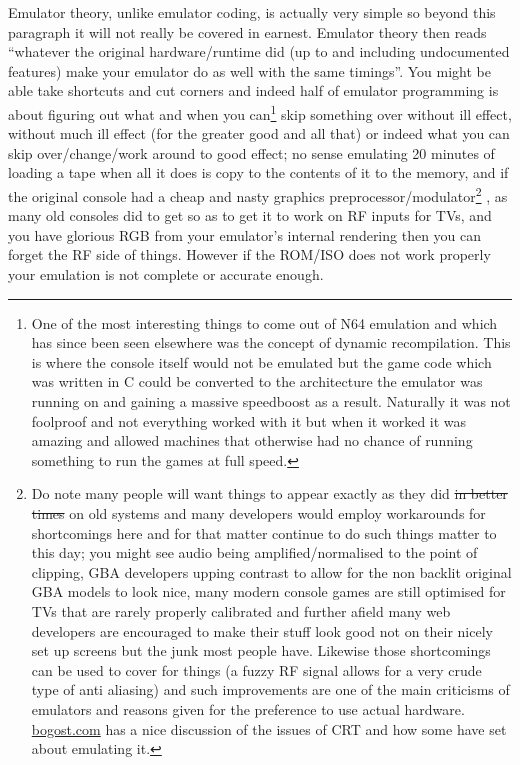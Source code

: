\documentclass[
]{book}
\begin{document}
Emulator theory, unlike emulator coding, is actually very simple so beyond this paragraph it will not really be covered in earnest. Emulator theory then reads ``whatever the original hardware/runtime did (up to and including undocumented features) make your emulator do as well with the same timings''. You might be able take shortcuts and cut corners and indeed half of emulator programming is about figuring out what and when you can\footnote{One of the most interesting things to come out of N64 emulation and which has since been seen elsewhere was the concept of dynamic recompilation. This is where the console itself would not be emulated but the game code which was written in C could be converted to the architecture the emulator was running on and gaining a massive speedboost as a result. Naturally it was not foolproof and not everything worked with it but when it worked it was amazing and allowed machines that otherwise had no chance of running something to run the games at full speed.} skip something over without ill effect, without much ill effect (for the greater good and all that) or indeed what you can skip over/change/work around to good effect; no sense emulating 20 minutes of loading a tape when all it does is copy to the contents of it to the memory, and if the original console had a cheap and nasty graphics preprocessor/modulator\footnote{Do note many people will want things to appear exactly as they did \sout{in better times} on old systems and many developers would employ workarounds for shortcomings here and for that matter continue to do such things matter to this day; you might see audio being amplified/normalised to the point of clipping, GBA developers upping contrast to allow for the non backlit original GBA models to look nice, many modern console games are still optimised for TVs that are rarely properly calibrated and further afield many web developers are encouraged to make their stuff look good not on their nicely set up screens but the junk most people have. Likewise those shortcomings can be used to cover for things (a fuzzy RF signal allows for a very crude type of anti aliasing) and such improvements are one of the main criticisms of emulators and reasons given for the preference to use actual hardware. \href{http://bogost.com/games/a_television_simulator/}{bogost.com} has a nice discussion of the issues of CRT and how some have set about emulating it.} , as many old consoles did to get so as to get it to work on RF inputs for TVs, and you have glorious RGB from your emulator's internal rendering then you can forget the RF side of things. However if the ROM/ISO does not work properly your emulation is not complete or accurate enough.
\end{document}
